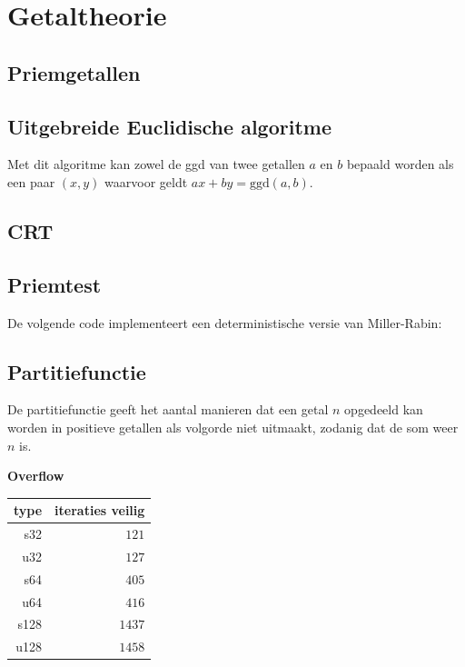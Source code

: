 \documentclass[10pt,a4paper,titlepage]{article}
\begin{document}
\section{Getaltheorie}
\subsection{Priemgetallen}



\subsection{Uitgebreide Euclidische algoritme}
Met dit algoritme kan zowel de ggd van twee getallen $a$ en $b$ bepaald worden als een paar $(x,y)$ waarvoor geldt $ax + by = \textrm{ggd}(a,b)$.

\begin{minipage}{0.5\textwidth}

\end{minipage}
\begin{minipage}{0.5\textwidth}

\end{minipage}

\subsection{CRT}


\subsection{Priemtest}

De volgende code implementeert een deterministische versie van Miller-Rabin:



\subsection{Partitiefunctie}

De partitiefunctie geeft het aantal manieren dat een getal $n$ opgedeeld kan worden in positieve getallen als volgorde niet uitmaakt, zodanig dat de som weer $n$ is.

\begin{minipage}{0.7\textwidth}

\end{minipage}
\begin{minipage}{0.3\textwidth}
\textbf{Overflow}

\begin{tabular}{|r|r|} \hline
type & iteraties veilig \\ \hline
s32 & $121$ \\ \hline
u32 & $127$ \\ \hline
s64 & $405$ \\ \hline
u64 & $416$ \\ \hline
s128 & $1437$ \\ \hline
u128 & $1458$ \\ \hline
\end{tabular}
\end{minipage}
\end{document}
